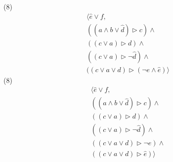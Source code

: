 \documentclass[12pt,a4paper]{article}
\begin{document}
\begin{multicols}{2}
	(8)
	\begin{align*} 
		\langle \hat{e} \lor f, 
		\\ ((a \land b \lor \hat{d}) \triangleright c) \land 
		\\ ((c \lor a) \triangleright d) \land 
		\\ ((c \lor a) \triangleright \neg\hat{d}) \land 
		\\ ((c \lor a \lor d) \triangleright (\neg{e} \land \hat{e}) \rangle
	\end{align*} 
	(8)
	\begin{align*} 
		\langle \hat{e} \lor f, 
		\\ ((a \land b \lor \hat{d}) \triangleright c) \land 
		\\ ((c \lor a) \triangleright d) \land 
		\\ ((c \lor a) \triangleright \neg\hat{d}) \land 
		\\ ((c \lor a \lor d) \triangleright \neg{e}) \land 
		\\ ((c \lor a \lor d) \triangleright \hat{e}) \rangle
	\end{align*} 
\end{multicols}
\end{document}

